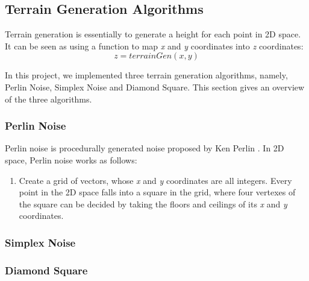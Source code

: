 \subsection{Terrain Generation Algorithms}
Terrain generation is essentially to generate a height for each point in 2D space. It can be seen as using a function to map \textit{x} and \textit{y} coordinates into \textit{z} coordinates: \[z=terrainGen(x, y)\]

In this project, we implemented three terrain generation algorithms, namely, Perlin Noise, Simplex Noise and Diamond Square. This section gives an overview of the three algorithms.

\subsubsection{Perlin Noise}
Perlin noise is procedurally generated noise proposed by Ken Perlin \cite{Perlin2002}. In 2D space, Perlin noise works as follows:
\begin{enumerate}
	\item Create a grid of vectors, whose \textit{x} and \textit{y} coordinates are all integers. Every point in the 2D space falls into a square in the grid, where four vertexes of the square can be decided by taking the floors and ceilings of its \textit{x} and \textit{y} coordinates. 
\end{enumerate}
\subsubsection{Simplex Noise}
\subsubsection{Diamond Square}
